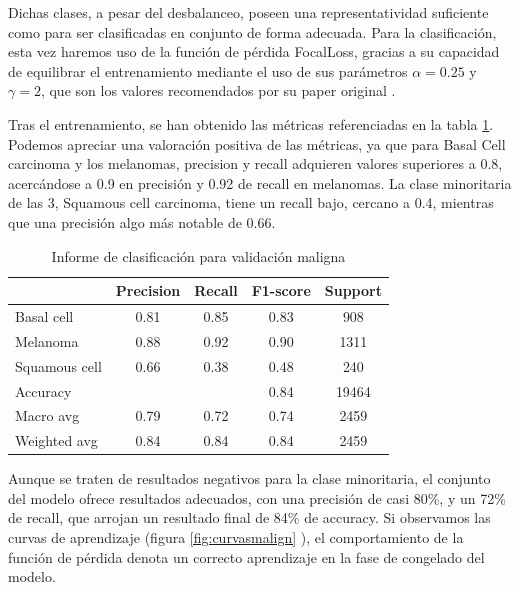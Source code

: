  Dichas clases, a pesar del desbalanceo, poseen una representatividad suficiente como para ser clasificadas en conjunto de forma adecuada. Para la clasificación, esta vez haremos uso de la función de pérdida FocalLoss, gracias a su capacidad de equilibrar el entrenamiento mediante el uso de sus parámetros $\alpha = 0.25$ y $\gamma = 2$, que son los valores recomendados por su paper original \cite{lin2018focal}.
 
 Tras el entrenamiento, se han obtenido las métricas referenciadas en la tabla \ref{tab:malignometrics}. Podemos apreciar una valoración positiva de las métricas, ya que para Basal Cell carcinoma y los melanomas, precision y recall adquieren valores superiores a 0.8, acercándose a 0.9 en precisión y 0.92 de recall en melanomas.  La clase minoritaria de las 3, Squamous cell carcinoma, tiene un recall bajo, cercano a 0.4, mientras que una precisión algo más notable de 0.66.

\begin{table}[!ht]
	\centering
	\begin{tabular}{|l|c|c|c|c|}
		\hline
		& Precision & Recall & F1-score & Support \\
		\hline
		Basal cell & 0.81 & 0.85 & 0.83 & 908 \\
		Melanoma & 0.88 & 0.92 & 0.90 & 1311 \\
		Squamous cell & 0.66 & 0.38 & 0.48 & 240 \\
		\hline
		Accuracy &  &  & 0.84 & 19464 \\
		Macro avg & 0.79& 0.72& 0.74&2459\\
		Weighted avg&0.84&0.84&0.84&2459\\
		\hline
	\end{tabular}
	\caption{Informe de clasificación para validación maligna}
	\label{tab:malignometrics}
\end{table}

Aunque se traten de resultados negativos para la clase minoritaria, el conjunto del modelo ofrece resultados  adecuados, con una precisión de casi 80\%, y un 72\% de recall, que arrojan un resultado final de 84\% de accuracy. Si observamos las curvas de aprendizaje (figura \ref{fig:curvasmalign} ), el comportamiento de la función de pérdida denota un correcto aprendizaje en la fase de congelado del modelo.


